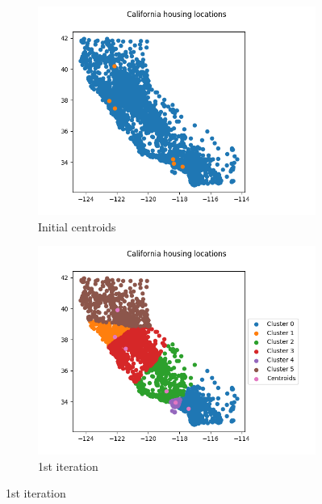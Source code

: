 \documentclass[a4paper]{article}
\begin{document}
\begin{figure}[!htp]
	\begin{subfigure}{0.5\columnwidth}
		\centering
		\includegraphics[width=\textwidth]{images/0.png}
		\caption{Initial centroids}
		\label{figure:inital-nodes}
	\end{subfigure}\hfill
	\begin{subfigure}{0.5\columnwidth}
		\centering
		\includegraphics[width=\textwidth]{images/1.png}
		\caption{1st iteration}
		\label{figure:iteration-1}
	\end{subfigure}
	

\end{figure}
\end{document}

